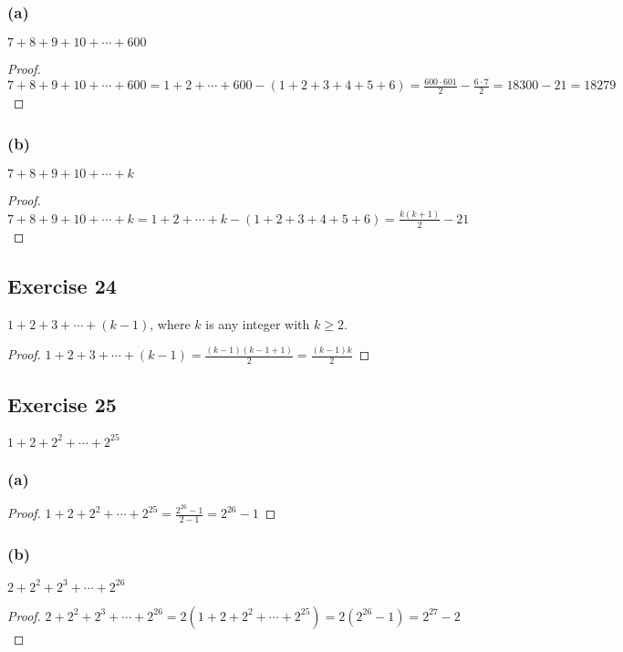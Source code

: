 \documentclass[14pt]{extarticle}
\newcommand{\dps}{\displaystyle}
\begin{document}
\subsubsection{(a)}
$7 + 8 + 9 + 10 + \cdots + 600$

\begin{proof}
    $\dps 7 + 8 + 9 + 10 + \cdots + 600 = 1 + 2 + \cdots + 600 - (1+2+3+4+5+6) = \frac{600 \cdot 601}{2} - \frac{6 \cdot 7}{2} = 18300 - 21 = 18279$
\end{proof}

\subsubsection{(b)}
$7 + 8 + 9 + 10 + \cdots + k$

\begin{proof}
    $\dps 7 + 8 + 9 + 10 + \cdots + k = 1 + 2 + \cdots + k - (1+2+3+4+5+6) = \frac{k(k+1)}{2} - 21$
\end{proof}

\subsection{Exercise 24}
$1 + 2 + 3 + \cdots + (k - 1)$, where $k$ is any integer with $k \geq 2$.

\begin{proof}
    $\dps 1 + 2 + 3 + \cdots + (k - 1) = \frac{(k-1)(k-1+1)}{2} = \frac{(k-1)k}{2}$
\end{proof}

\subsection{Exercise 25}
$1 + 2 + 2^2 + \cdots + 2^{25}$

\subsubsection{(a)}

\begin{proof}
    $\dps 1 + 2 + 2^2 + \cdots + 2^{25} = \frac{2^{26} - 1}{2-1} = 2^{26} - 1$
\end{proof}

\subsubsection{(b)}
$2 + 2^2 + 2^3 + \cdots + 2^{26}$

\begin{proof}
    $2 + 2^2 + 2^3 + \cdots + 2^{26} = 2(1 + 2 + 2^2 + \cdots + 2^{25}) = 2(2^{26} - 1) = 2^{27}-2$
\end{proof}
\end{document}
